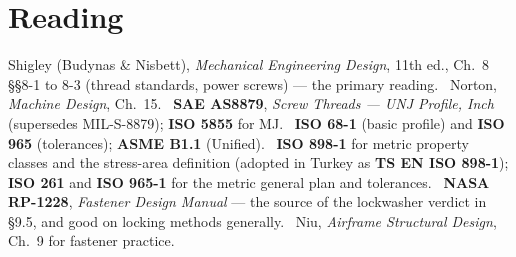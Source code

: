 \documentclass[11pt,a4paper]{article}
\begin{document}
\section*{Reading}
\footnotesize
Shigley (Budynas \& Nisbett), \emph{Mechanical Engineering Design}, 11th ed., Ch.\ 8 \S\S8-1 to 8-3
(thread standards, power screws) --- the primary reading. \ Norton, \emph{Machine Design}, Ch.\ 15. \
\textbf{SAE AS8879}, \emph{Screw Threads --- UNJ Profile, Inch} (supersedes MIL-S-8879); \textbf{ISO
5855} for MJ. \ \textbf{ISO 68-1} (basic profile) and \textbf{ISO 965} (tolerances); \textbf{ASME
B1.1} (Unified). \ \textbf{ISO 898-1} for metric property classes and the stress-area definition (adopted in Turkey as
\textbf{TS EN ISO 898-1}); \textbf{ISO 261} and \textbf{ISO 965-1} for the metric general plan and
tolerances. \ \textbf{NASA RP-1228}, \emph{Fastener Design Manual} --- the source of the lockwasher
verdict in \S9.5, and good on locking methods generally. \ Niu, \emph{Airframe Structural Design},
Ch.\ 9 for fastener practice.
\end{document}
